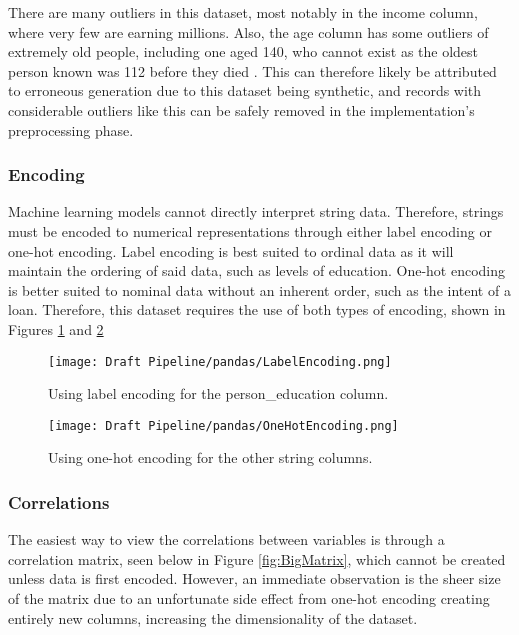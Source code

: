 There are many outliers in this dataset, most notably in the income column, where very few are earning millions.
Also, the age column has some outliers of extremely old people, including one aged 140, who cannot exist as the oldest 
person known was 112 before they died \autocite{sky_news_worlds_nodate}. This can therefore likely be attributed 
to erroneous generation due to this dataset being synthetic, and records with considerable outliers like this can 
be safely removed in the implementation's preprocessing phase.

\subsubsection{Encoding}
Machine learning models cannot directly interpret string data. Therefore, strings must be encoded to numerical representations
through either label encoding or one-hot encoding. Label encoding is best suited to ordinal data as it will maintain the ordering 
of said data, such as levels of education. One-hot encoding is better suited to nominal data without an inherent order, such as 
the intent of a loan. Therefore, this dataset requires the use of both types of encoding, shown in Figures \ref{fig:LabelEncoding}
and \ref{fig:OneHotEncoding}


\begin{figure}[H]
    \centering
    \texttt{[image: Draft Pipeline/pandas/LabelEncoding.png]}
    \caption{Using label encoding for the person\_education column.}
    \label{fig:LabelEncoding}
\end{figure}

\begin{figure}[H]
    \centering
    \texttt{[image: Draft Pipeline/pandas/OneHotEncoding.png]}
    \caption{Using one-hot encoding for the other string columns.}
    \label{fig:OneHotEncoding}
\end{figure}

\subsubsection{Correlations}
The easiest way to view the correlations between variables is through a correlation matrix, seen below in Figure \ref{fig:BigMatrix}, which 
cannot be created unless data is first encoded. However, an immediate observation is the sheer size of the matrix due to an unfortunate side 
effect from one-hot encoding creating entirely new columns, increasing the dimensionality of the dataset. 


